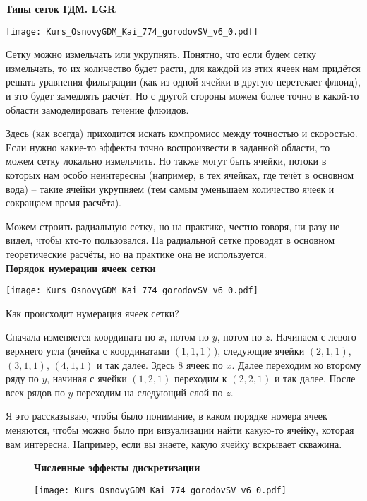 \textbf{Типы сеток ГДМ. LGR}

\texttt{[image: Kurs\_OsnovyGDM\_Kai\_774\_gorodovSV\_v6\_0.pdf]}

Сетку можно измельчать или укрупнять. Понятно, что если будем сетку измельчать, то их количество будет расти, для каждой из этих ячеек нам придётся решать уравнения фильтрации (как из одной ячейки в другую перетекает флюид), и это будет замедлять расчёт. Но с другой стороны можем более точно в какой-то области замоделировать течение флюидов.

Здесь (как всегда) приходится искать компромисс между точностью и скоростью.
Если нужно какие-то эффекты точно воспроизвести в заданной области, то можем сетку локально измельчить.
Но также могут быть ячейки, потоки в которых нам особо неинтересны (например, в тех ячейках, где течёт в основном вода) -- такие ячейки укрупняем (тем самым уменьшаем количество ячеек и сокращаем время расчёта).

Можем строить радиальную сетку, но на практике, честно говоря, ни разу не видел, чтобы кто-то пользовался.
На радиальной сетке проводят в основном теоретические расчёты, но на практике она не используется.
\\

\textbf{Порядок нумерации ячеек сетки}

\texttt{[image: Kurs\_OsnovyGDM\_Kai\_774\_gorodovSV\_v6\_0.pdf]}

Как происходит нумерация ячеек сетки?

Сначала изменяется координата по $x$, потом по $y$, потом по $z$.
Начинаем с левого верхнего угла (ячейка с координатами $\left(1,1,1\right)$), следующие ячейки $\left(2,1,1\right)$, $\left(3,1,1\right)$, $\left(4,1,1\right)$ и так далее. Здесь 8 ячеек по $x$.
Далее переходим ко второму ряду по $y$, начиная с ячейки $\left(1,2,1\right)$ переходим к $\left(2,2,1\right)$ и так далее.
После всех рядов по $y$ переходим на следующий слой по $z$.

Я это рассказываю, чтобы было понимание, в каком порядке номера ячеек меняются, чтобы можно было при визуализации найти какую-то ячейку, которая вам интересна.
Например, если вы знаете, какую ячейку вскрывает скважина.
\\

\begin{figure}[H]
\textbf{Численные эффекты дискретизации}

\texttt{[image: Kurs\_OsnovyGDM\_Kai\_774\_gorodovSV\_v6\_0.pdf]}
\end{figure}

